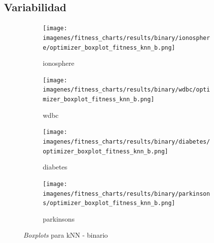 \subsection{Variabilidad}
\begin{figure}[htp]
    \centering
    \begin{subfigure}[htp]{0.45\textwidth}
        \texttt{[image: imagenes/fitness\_charts/results/binary/ionosphere/optimizer\_boxplot\_fitness\_knn\_b.png]}
        \caption{ionosphere}
        \label{fig:boxplot_ionosphere}
    \end{subfigure}
    \hfill
    \begin{subfigure}[htp]{0.45\textwidth}
        \texttt{[image: imagenes/fitness\_charts/results/binary/wdbc/optimizer\_boxplot\_fitness\_knn\_b.png]}
        \caption{wdbc}
        \label{fig:boxplot_wdbc}
    \end{subfigure}

    \vspace{0.5cm} %

    \begin{subfigure}[htp]{0.45\textwidth}
        \texttt{[image: imagenes/fitness\_charts/results/binary/diabetes/optimizer\_boxplot\_fitness\_knn\_b.png]}
        \caption{diabetes}
        \label{fig:boxplot_diabetes}
    \end{subfigure}
    \hfill
    \begin{subfigure}[htp]{0.45\textwidth}
        \texttt{[image: imagenes/fitness\_charts/results/binary/parkinsons/optimizer\_boxplot\_fitness\_knn\_b.png]}
        \caption{parkinsons}
        \label{fig:boxplot_parkinsons}
    \end{subfigure}

    \caption{\textit{Boxplots} para kNN - binario}
    \label{fig:boxplot_knn-bin}
\end{figure}

